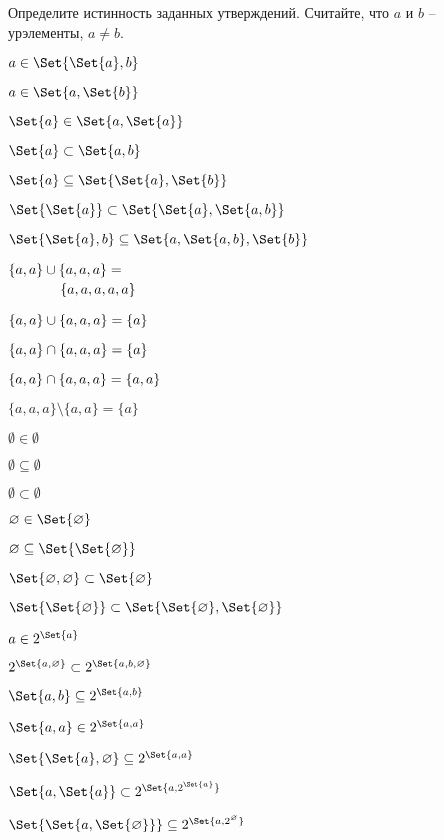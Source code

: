 \documentclass[a4paper,12pt]{article}
\begin{document}
\begin{tasks}
    \item Определите истинность заданных утверждений.
    Считайте, что $a$ и $b$ \--- урэлементы, $a \neq b$.

    \begin{multicols}{3}
    \begin{subtasks}
        \item $a \in \Set{\Set{a}, b}$
        \item $a \in \Set{a, \Set{b}}$
        \item $\Set{a} \in \Set{a, \Set{a}}$
        \item $\Set{a} \subset \Set{a, b}$
        \item $\Set{a} \subseteq \Set{\Set{a}, \Set{b}}$
        \item $\Set{\Set{a}} \subset \Set{\Set{a}, \Set{a, b}}$
        \item $\Set{\Set{a}, b} \subseteq \Set{a, \Set{a, b}, \Set{b}}$
        \item $\begin{multlined}[t]
            \{ a,a \} \union \{ a,a,a \} = \\
            \{ a,a,a,a,a \}
        \end{multlined}$
        \item $\{ a,a \} \cup \{ a,a,a \} = \{ a \}$
        \item $\{ a,a \} \cap \{ a,a,a \} = \{ a \}$
        \item $\{ a,a \} \cap \{ a,a,a \} = \{ a,a \}$
        \item $\{ a,a,a \} \setminus \{ a,a \} = \{ a \}$
        \item $\emptyset \in \emptyset$
        \item $\emptyset \subseteq \emptyset$
        \item $\emptyset \subset \emptyset$
        \item $\emptyset \in \Set{\emptyset}$
        \item $\emptyset \subseteq \Set{\Set{\emptyset}}$
        \item $\Set{\emptyset, \emptyset} \subset \Set{\emptyset}$
        \item $\Set{\Set{\emptyset}} \subset \Set{\Set{\emptyset}, \Set{\emptyset}}$
        \item $a \in 2^{\Set{a}}$
        \item $2^{\Set{a, \emptyset}} \subset 2^{\Set{a, b, \emptyset}}$
        \item $\Set{a, b} \subseteq 2^{\Set{a, b}}$
        \item $\Set{a, a} \in 2^{\Set{a, a}}$
        \item $\Set{\Set{a}, \emptyset} \subseteq 2^{\Set{a, a}}$
        \item $\Set{a, \Set{a}} \subset 2^{\Set{a, 2^{\Set{a}}}}$
        \item $\Set{\Set{a, \Set{\emptyset}}} \subseteq 2^{\Set{a, 2^{\emptyset}}}$
    \end{subtasks}
    \end{multicols}



\end{tasks}
\end{document}

